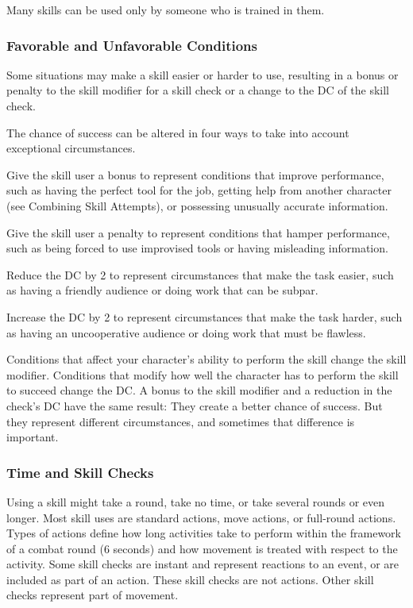 Many skills can be used only by someone who is trained in them.

\subsubsection{Favorable and Unfavorable Conditions}
Some situations may make a skill easier or harder to use, resulting in a bonus or penalty to the skill modifier for a skill check or a change to the DC of the skill check.

The chance of success can be altered in four ways to take into account exceptional circumstances.
\begin{enumerate*}
\item Give the skill user a  bonus to represent conditions that improve performance, such as having the perfect tool for the job, getting help from another character (see Combining Skill Attempts), or possessing unusually accurate information.
\item Give the skill user a  penalty to represent conditions that hamper performance, such as being forced to use improvised tools or having misleading information.
\item Reduce the DC by 2 to represent circumstances that make the task easier, such as having a friendly audience or doing work that can be subpar.
\item  Increase the DC by 2 to represent circumstances that make the task harder, such as having an uncooperative audience or doing work that must be flawless.
\end{enumerate*}

Conditions that affect your character's ability to perform the skill change the skill modifier. Conditions that modify how well the character has to perform the skill to succeed change the DC. A bonus to the skill modifier and a reduction in the check's DC have the same result: They create a better chance of success. But they represent different circumstances, and sometimes that difference is important.

\subsubsection{Time and Skill Checks}
Using a skill might take a round, take no time, or take several rounds or even longer. Most skill uses are standard actions, move actions, or full-round actions. Types of actions define how long activities take to perform within the framework of a combat round (6 seconds) and how movement is treated with respect to the activity. Some skill checks are instant and represent reactions to an event, or are included as part of an action. These skill checks are not actions. Other skill checks represent part of movement.

